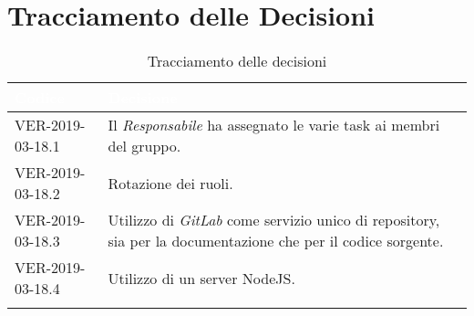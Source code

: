 \newpage
\section{Tracciamento delle Decisioni}

\begin{longtable}{|C{.40\textwidth}|C{.60\textwidth}|}
\hline
{}\textbf{\textcolor{white}{Codice}} & \textbf{\textcolor{white}{Decisione}}\\
\hline
VER-2019-03-18.1 & Il \textit{Responsabile} ha assegnato le varie task ai membri del gruppo. \\
\hline
{}VER-2019-03-18.2 & Rotazione dei ruoli. \\
\hline
VER-2019-03-18.3 & Utilizzo di \textit{GitLab} come servizio unico di repository, sia per la documentazione che per il codice sorgente. \\
\hline
{}VER-2019-03-18.4 & Utilizzo di un server NodeJS. \\
\hline

\caption{Tracciamento delle decisioni}
\end{longtable}
